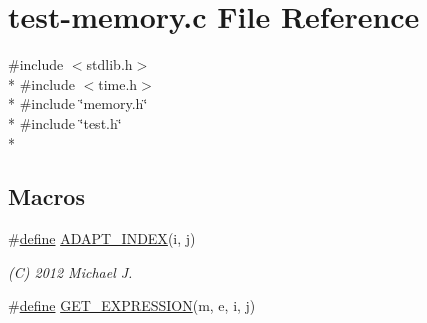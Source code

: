 \hypertarget{test-memory_8c}{\section{test-\/memory.c File Reference}
\label{test-memory_8c}
}
{\ttfamily \#include $<$stdlib.\+h$>$}\\*
{\ttfamily \#include $<$time.\+h$>$}\\*
{\ttfamily \#include \char`\"{}memory.\+h\char`\"{}}\\*
{\ttfamily \#include \char`\"{}test.\+h\char`\"{}}\\*
\subsection*{Macros}
\begin{DoxyCompactItemize}
\item 
\#\hyperlink{nativefunctions_8h_a06f28a72fd48e4a07d1d9e541bad304a}{define} \hyperlink{test-memory_8c_a253272fd1353a150c52d57751467b30a}{A\+D\+A\+P\+T\+\_\+\+I\+N\+D\+E\+X}(i, j)
\begin{DoxyCompactList}\small\item\em (C) 2012 Michael J. \end{DoxyCompactList}\item 
\#\hyperlink{nativefunctions_8h_a06f28a72fd48e4a07d1d9e541bad304a}{define} \hyperlink{test-memory_8c_a3af42f4efb21e67ccbbd5ca06e61eb4f}{G\+E\+T\+\_\+\+E\+X\+P\+R\+E\+S\+S\+I\+O\+N}(m, e, i, j)
\end{DoxyCompactItemize}
